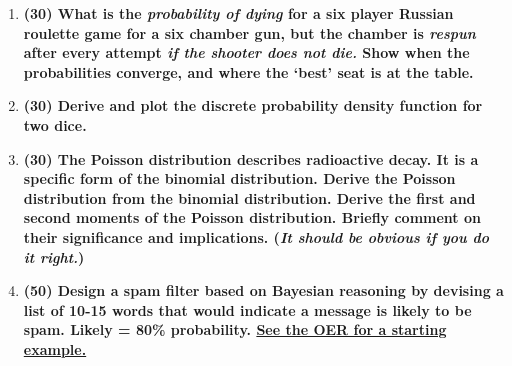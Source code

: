 \documentclass[11pt,a4paper]{article}
\begin{document}
\begin{enumerate}[leftmargin=*,topsep=0pt,font=\bfseries]
    \item\textbf{(30) What is the \textit{probability of dying} for a six player Russian roulette game for a six chamber gun, but the chamber is \textit{respun} after every attempt \textit{if the shooter does not die.} Show when the probabilities converge, and where the ‘best’ seat is at the table.}
        \vspace{\baselineskip}
    
        
        
        
        
        
        
        
        
        
        
        
        
        
        \newpage
    \item\textbf{(30) Derive and plot the discrete probability density function for two dice.}
        \vspace{\baselineskip}
        
        
        
        
        
        
        
        
        
        
        
        
        
        
        \newpage
    \item\textbf{(30) The Poisson distribution describes radioactive decay. It is a specific form of the binomial distribution. Derive the Poisson distribution from the binomial distribution. Derive the first and second moments of the Poisson distribution. Briefly comment on their significance and implications. (\textit{It should be obvious if you do it right.})}
        \vspace{\baselineskip}

        
        
        
        
        
        
        
        
        
        
        
        
        

        
        
        \newpage
    \item\textbf{(50) Design a spam filter based on Bayesian reasoning by devising a list of 10-15 words that would indicate a message is likely to be spam. Likely = 80\% probability. \href{https://courses.lumenlearning.com/uidaho-riskassessment/chapter/bayes-theorem/}{See the OER for a starting example.}}
        \vspace{\baselineskip}


















\end{enumerate}
\end{document}

